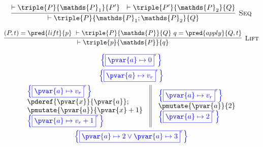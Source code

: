 \[
\infer[\textsc{Seq}]
{
	\vdash \triple
	{P}
	{\mathds{P}_1; \mathds{P}_2}
	{Q}
}
{
	\vdash \triple
	{P}
	{\mathds{P}_1}
	{P'}\ \
	\vdash \triple
	{P'}
	{\mathds{P}_2}
	{Q}
}
\]

\[
\infer[\textsc{Lift}]
{
	\vdash \triple
	{p}
	{\mathds{P}}
	{q}
}
{
	(P, t) = \pred{lift}{p}\
	\vdash \triple
	{P}
	{\mathds{P}}
	{Q}\
	q = \pred{apply}{Q, t}
}
\]

\begin{gather*}
\color{blue} \left\lbrace \boxed{\pvar{a} \mapsto 0}^r \right\rbrace \\
\color{blue} \left\lbrace \boxed{\pvar{a} \mapsto v_r}^r \right\rbrace \\
\begin{array}{c || c}
\begin{array}{l}
\color{blue} \left\lbrace \boxed{\pvar{a} \mapsto v_r}^r \right\rbrace \\
\pderef{\pvar{x}}{\pvar{a}}; \\
\pmutate{\pvar{a}}{\pvar{x} + 1} \\
\color{blue} \left\lbrace \boxed{\pvar{a} \mapsto v_r + 1}^r \right\rbrace
\end{array}
&
\begin{array}{l}
\color{blue} \left\lbrace \boxed{\pvar{a} \mapsto v_r}^r \right\rbrace \\
\pmutate{\pvar{a}}{2} \\
\color{blue} \left\lbrace \boxed{\pvar{a} \mapsto 2}^r \right\rbrace
\end{array}
\end{array} \\
\color{blue} \left\lbrace \boxed{\pvar{a} \mapsto 2 \lor \pvar{a} \mapsto 3}^r \right\rbrace
\end{gather*}

